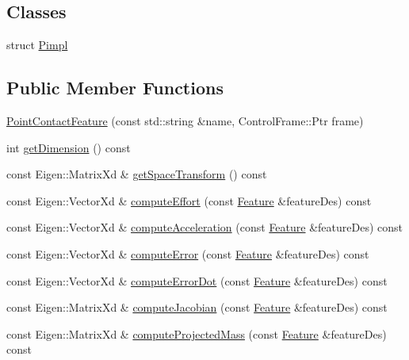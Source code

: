 \subsection*{Classes}
\begin{DoxyCompactItemize}
\item 
struct \hyperlink{structocra_1_1PointContactFeature_1_1Pimpl}{Pimpl}
\end{DoxyCompactItemize}
\subsection*{Public Member Functions}
\begin{DoxyCompactItemize}
\item 
\hyperlink{classocra_1_1PointContactFeature_aeaaae6acc15b47e89210b57dd34b3f73}{Point\+Contact\+Feature} (const std\+::string \&name, Control\+Frame\+::\+Ptr frame)
\item 
int \hyperlink{classocra_1_1PointContactFeature_aa2621ee588c9b593a68ace1a167d4418}{get\+Dimension} () const
\item 
const Eigen\+::\+Matrix\+Xd \& \hyperlink{classocra_1_1PointContactFeature_afb64d5566b4e57c7121e88799c15bac6}{get\+Space\+Transform} () const
\item 
const Eigen\+::\+Vector\+Xd \& \hyperlink{classocra_1_1PointContactFeature_a081fc445440857623f3df1b272a80871}{compute\+Effort} (const \hyperlink{classocra_1_1Feature}{Feature} \&feature\+Des) const
\item 
const Eigen\+::\+Vector\+Xd \& \hyperlink{classocra_1_1PointContactFeature_ab8f6f7f395e2dc59d74c0676206b12bb}{compute\+Acceleration} (const \hyperlink{classocra_1_1Feature}{Feature} \&feature\+Des) const
\item 
const Eigen\+::\+Vector\+Xd \& \hyperlink{classocra_1_1PointContactFeature_a6d9c92bc50784f7ecd8dda683d32b7aa}{compute\+Error} (const \hyperlink{classocra_1_1Feature}{Feature} \&feature\+Des) const
\item 
const Eigen\+::\+Vector\+Xd \& \hyperlink{classocra_1_1PointContactFeature_a73527a8f55f6a693d975b7a4bf3bf422}{compute\+Error\+Dot} (const \hyperlink{classocra_1_1Feature}{Feature} \&feature\+Des) const
\item 
const Eigen\+::\+Matrix\+Xd \& \hyperlink{classocra_1_1PointContactFeature_a68a3025a23aa9ff8bec2aeb0c966c352}{compute\+Jacobian} (const \hyperlink{classocra_1_1Feature}{Feature} \&feature\+Des) const
\item 
const Eigen\+::\+Matrix\+Xd \& \hyperlink{classocra_1_1PointContactFeature_a3798f3cd3649bf2360876610f7a4cf7a}{compute\+Projected\+Mass} (const \hyperlink{classocra_1_1Feature}{Feature} \&feature\+Des) const

\end{DoxyCompactItemize}
